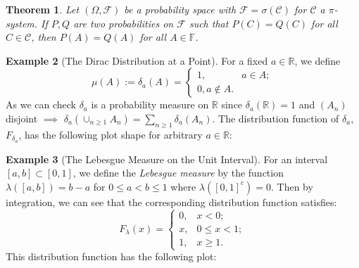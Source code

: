 \documentclass[12pt,reqno]{article}
\renewcommand{\emph}[1]{\textit{#1}}
\theoremstyle{plain}
\newtheorem{theorem}{Theorem}[section]
\theoremstyle{definition}
\newtheorem{example}[theorem]{Example}
\begin{document}
\begin{theorem} 
Let $(\Omega, \mathcal{F})$ be a probability space with 
$\mathcal{F} = \sigma(\mathcal{C})$ for $\mathcal{C}$ a $\pi$-system. 
If $P,Q$ are two probabilities on $\mathcal{F}$ such that 
$P(C) = Q(C)$ for all $C \in \mathcal{C}$, then 
$P(A) = Q(A)$ for all $A \in \mathbb{F}$. 
\end{theorem} 

\begin{example}[The Dirac Distribution at a Point]
For a fixed $a \in \mathbb{R}$, we define 
\[
\mu(A) := \delta_a(A) = \begin{cases} 
     1, & a \in A; \\ 0, a \notin A.
     \end{cases}
\]
As we can check $\delta_a$ is a probability measure on $\mathbb{R}$ since 
$\delta_a(\mathbb{R}) = 1$ and $(A_n)$ disjoint $\implies$ 
$\delta_a\left(\cup_{n \geq 1} A_n\right) = \sum_{n \geq 1} \delta_a(A_n)$. 
The distribution function of $\delta_a$, $F_{\delta_a}$, has the following 
plot shape for arbitrary $a \in \mathbb{R}$: 
\begin{center}
\end{center} 
\end{example} 

\begin{example}[The Lebesgue Measure on the Unit Interval]
For an interval $[a,b] \subset [0,1]$, we define the 
\emph{Lebesgue measure} by the function 
$\lambda([a,b]) = b-a$ for $0 \leq a < b \leq 1$ where 
$\lambda([0,1]^c) = 0$. Then by integration, we can see that the 
corresponding distribution function satisfies:
\[
F_{\lambda}(x) = \begin{cases} 
     0, & x < 0; \\ 
     x, & 0 \leq x < 1; \\ 
     1, & x \geq 1. 
     \end{cases} 
\]
This distribution function has the following plot: 
\begin{center}
\end{center} 
\end{example} 
\end{document}
